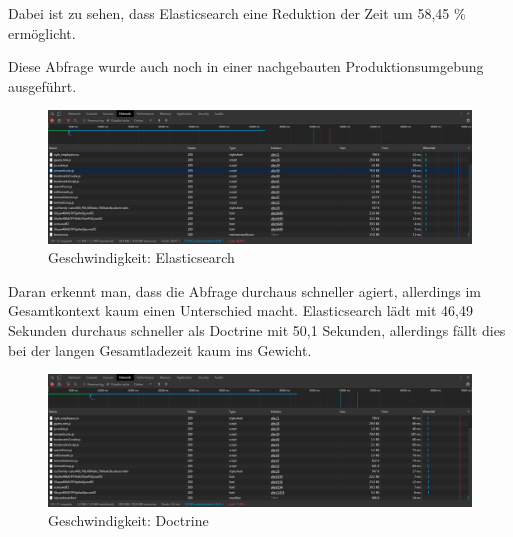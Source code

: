 Dabei ist zu sehen, dass Elasticsearch eine Reduktion der Zeit um 58,45 \% ermöglicht.

Diese Abfrage wurde auch noch in einer nachgebauten Produktionsumgebung ausgeführt. 

\begin{figure}
	\centering
	\includegraphics[width=1\linewidth]{images/setup/query/time_prod_ela.png}
	\caption{Geschwindigkeit: Elasticsearch}
	\label{img:timeProdEla}
\end{figure}

Daran erkennt man, dass die Abfrage durchaus schneller agiert, allerdings im Gesamtkontext kaum einen Unterschied macht. Elasticsearch lädt mit 46,49 Sekunden durchaus schneller als Doctrine mit 50,1 Sekunden, allerdings fällt dies bei der langen Gesamtladezeit kaum ins Gewicht.

\begin{figure}
	\centering
	\includegraphics[width=1\linewidth]{images/setup/query/time_prod_db.png}
	\caption{Geschwindigkeit: Doctrine}
	\label{img:timeProdDb}
\end{figure}

